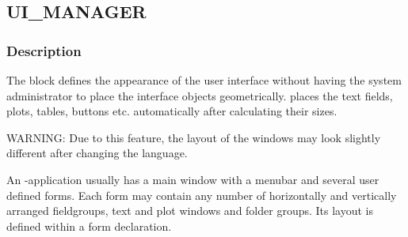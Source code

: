 \newpage
\subsection{UI\_MANAGER}
\label{sec:uimanager}
\subsubsection{Description}
\label{sec:uidescription}
The \UIMANAGER{} block defines the appearance of the user interface
without having the system administrator
to place the interface objects geometrically. \INTENS{} places
the text fields, plots, tables, buttons etc.
automatically after calculating their sizes.

WARNING:  Due to this feature, the layout of the windows may look
slightly different after changing the language.



An \INTENS{}-application usually has a main window with a menubar and
several user defined forms.
Each form may contain any number of horizontally
and vertically arranged fieldgroups, text
and plot windows and folder groups. Its layout is defined within a form declaration.
